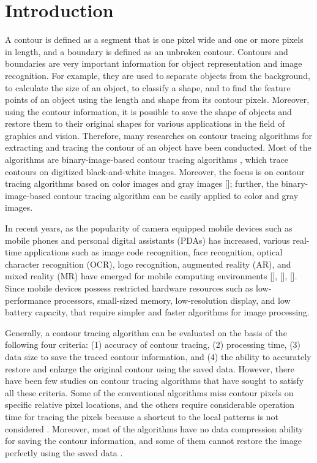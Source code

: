 
\section{Introduction}

A contour is defined as a segment that is one pixel wide and one or more pixels in length, and a boundary is defined as an unbroken contour\cite{Mcqueen2004Contour}. Contours and boundaries are very important information for object representation and image recognition. For example, they are used to separate objects from the background, to calculate the size of an object, to classify a shape, and to find the feature points of an object using the length and shape from its contour pixels\cite{Pratt????Digital,Gose1996Pattern}. Moreover, using the contour information, it is possible to save the shape of objects and restore them to their original shapes for various applications in the field of graphics and vision. Therefore, many researches on contour tracing algorithms for extracting and tracing the contour of an object have been conducted. Most of the algorithms are binary-image-based contour tracing algorithms \cite{Pitas2000Digital,Gose1996Pattern,Das1990Bivariate,Papert1973Uses,Cheong2006Improved,Mirante1982Radial,Pavlidis2012Algorithms}, which trace contours on digitized black-and-white images. Moreover, the focus is on contour tracing algorithms based on color images and gray images []; further, the binary-image-based contour tracing algorithm can be easily applied to color and gray images.

In recent years, as the popularity of camera equipped mobile devices such as mobile phones and personal digital assistants (PDAs) has increased, various real-time applications such as image code recognition, face recognition, optical character recognition (OCR), logo recognition, augmented reality (AR), and mixed reality (MR) have emerged for mobile computing environments [], [], []. Since mobile devices possess restricted hardware resources such as low-performance processors, small-sized memory, low-resolution display, and low battery capacity, that require simpler and faster algorithms for image processing. 

Generally, a contour tracing algorithm can be evaluated on the basis of the following four criteria: (1) accuracy of contour tracing, (2) processing time, (3) data size to save the traced contour information, and (4) the ability to accurately restore and enlarge the original contour using the saved data. However, there have been few studies on contour tracing algorithms that have sought to satisfy all these criteria. Some of the conventional algorithms miss contour pixels on specific relative pixel locations, and the others require considerable operation time for tracing the pixels because a shortcut to the local patterns is not considered \cite{Cheong2006Improved,Cheong2006Advanced}. Moreover, most of the algorithms have no data compression ability for saving the contour information, and some of them cannot restore the image perfectly using the saved data \cite{Miyatake1997Contour}. 

